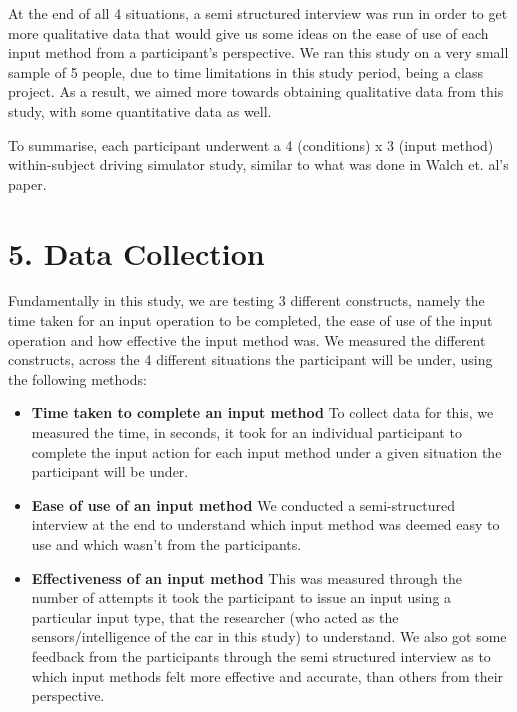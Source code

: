\documentclass{sigchi}
\begin{document}
At the end of all 4 situations, a semi structured interview was run in order to get more qualitative data that would give us some ideas on the ease of use of each input method from a participant's perspective. We ran this study on a very small sample of 5 people, due to time limitations in this study period, being a class project. As a result, we aimed more towards obtaining qualitative data from this study, with some quantitative data as well.

To summarise, each participant underwent a 4 (conditions) x 3 (input method) within-subject driving simulator study, similar to what was done in Walch et. al's paper\cite{Walch2016}. 

\section{5. Data Collection}
Fundamentally in this study, we are testing 3 different constructs, namely the time taken for an input operation to be completed, the ease of use of the input operation and how effective the input method was. We measured the different constructs, across the 4 different situations the participant will be under, using the following methods:

\begin{itemize}
\item \textbf{Time taken to complete an input method}
\newline
To collect data for this, we measured the time, in seconds, it took for an individual participant to complete the input action for each input method under a given situation the participant will be under.
\item \textbf{Ease of use of an input method}
\newline
We conducted a semi-structured interview at the end to understand which input method was deemed easy to use and which wasn't from the participants.
\item \textbf{Effectiveness of an input method}
\newline
This was measured through the number of attempts it took the participant to issue an input using a particular input type, that the researcher (who acted as the sensors/intelligence of the car in this study) to understand. We also got some feedback from the participants through the semi structured interview as to which input methods felt more effective and accurate, than others from their perspective.
\end{itemize}
\end{document}
